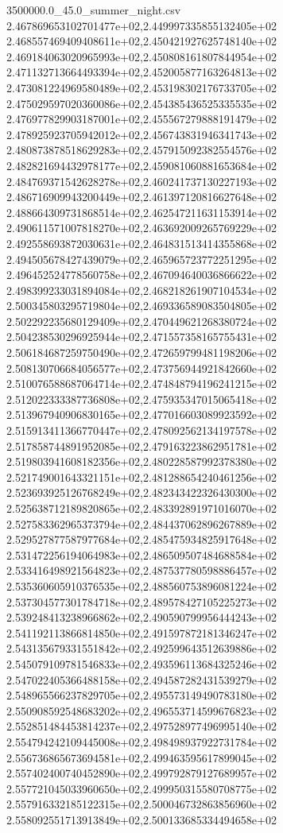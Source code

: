 \begin{filecontents*}{3500000.0_45.0_summer_night.csv}
2.467869653102701477e+02,2.449997335855132405e+02
2.468557469409408611e+02,2.450421927625748140e+02
2.469184063020965993e+02,2.450808161807844954e+02
2.471132713664493394e+02,2.452005877163264813e+02
2.473081224969580489e+02,2.453198302176733705e+02
2.475029597020360086e+02,2.454385436525335535e+02
2.476977829903187001e+02,2.455567279888191479e+02
2.478925923705942012e+02,2.456743831946341743e+02
2.480873878518629283e+02,2.457915092382554576e+02
2.482821694432978177e+02,2.459081060881653684e+02
2.484769371542628278e+02,2.460241737130227193e+02
2.486716909943200449e+02,2.461397120816627648e+02
2.488664309731868514e+02,2.462547211631153914e+02
2.490611571007818270e+02,2.463692009265769229e+02
2.492558693872030631e+02,2.464831513414355868e+02
2.494505678427439079e+02,2.465965723772251295e+02
2.496452524778560758e+02,2.467094640036866622e+02
2.498399233031894084e+02,2.468218261907104534e+02
2.500345803295719804e+02,2.469336589083504805e+02
2.502292235680129409e+02,2.470449621268380724e+02
2.504238530296925944e+02,2.471557358165755431e+02
2.506184687259750490e+02,2.472659799481198206e+02
2.508130706684056577e+02,2.473756944921842660e+02
2.510076588687064714e+02,2.474848794196241215e+02
2.512022333387736808e+02,2.475935347015065418e+02
2.513967940906830165e+02,2.477016603089923592e+02
2.515913411366770447e+02,2.478092562134197578e+02
2.517858744891952085e+02,2.479163223862951781e+02
2.519803941608182356e+02,2.480228587992378380e+02
2.521749001643321151e+02,2.481288654240461256e+02
2.523693925126768249e+02,2.482343422326430300e+02
2.525638712189820865e+02,2.483392891971016070e+02
2.527583362965373794e+02,2.484437062896267889e+02
2.529527877587977684e+02,2.485475934825917648e+02
2.531472256194064983e+02,2.486509507484688584e+02
2.533416498921564823e+02,2.487537780598886457e+02
2.535360605910376535e+02,2.488560753896081224e+02
2.537304577301784718e+02,2.489578427105225273e+02
2.539248413238966862e+02,2.490590799956444243e+02
2.541192113866814850e+02,2.491597872181346247e+02
2.543135679331551842e+02,2.492599643512639886e+02
2.545079109781546833e+02,2.493596113684325246e+02
2.547022405366488158e+02,2.494587282431539279e+02
2.548965566237829705e+02,2.495573149490783180e+02
2.550908592548683202e+02,2.496553714599676823e+02
2.552851484453814237e+02,2.497528977496995140e+02
2.554794242109445008e+02,2.498498937922731784e+02
2.556736865673694581e+02,2.499463595617899045e+02
2.557402400740452890e+02,2.499792879127689957e+02
2.557721045033960650e+02,2.499950315580708775e+02
2.557916332185122315e+02,2.500046732863856960e+02
2.558092551713913849e+02,2.500133685334494658e+02

\end{filecontents*}
